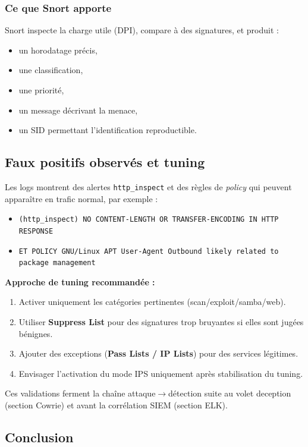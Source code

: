 \documentclass[12pt,a4paper,openany]{report}
\begin{document}
	\subsubsection{Ce que Snort apporte}
	Snort inspecte la charge utile (DPI), compare à des signatures, et produit :
	\begin{itemize}
		\item un horodatage précis,
		\item une classification,
		\item une priorité,
		\item un message décrivant la menace,
		\item un SID permettant l'identification reproductible.
	\end{itemize}
	
	\subsection{Faux positifs observés et tuning}
	
	Les logs montrent des alertes \texttt{http\_inspect} et des règles de \textit{policy} qui peuvent apparaître en trafic normal, par exemple :
	\begin{itemize}
		\item \texttt{(http\_inspect) NO CONTENT-LENGTH OR TRANSFER-ENCODING IN HTTP RESPONSE}
		\item \texttt{ET POLICY GNU/Linux APT User-Agent Outbound likely related to package management}
	\end{itemize}
	
	\textbf{Approche de tuning recommandée :}
	\begin{enumerate}[leftmargin=*]
		\item Activer uniquement les catégories pertinentes (scan/exploit/samba/web).
		\item Utiliser \textbf{Suppress List} pour des signatures trop bruyantes si elles sont jugées bénignes.
		\item Ajouter des exceptions (\textbf{Pass Lists / IP Lists}) pour des services légitimes.
		\item Envisager l'activation du mode IPS uniquement après stabilisation du tuning.
	\end{enumerate}
	
	Ces validations ferment la chaîne attaque$\rightarrow$détection suite au volet deception (section Cowrie) et avant la corrélation SIEM (section ELK).
	
	\subsection{Conclusion}
	
\end{document}
